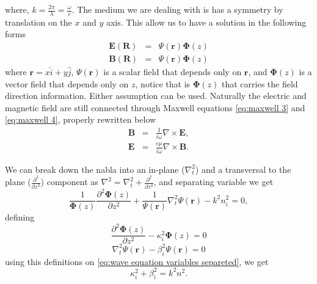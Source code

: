 \documentclass[12pt,twoside,english]{book}
\renewcommand{\~}{\perispomeni}%
\numberwithin{equation}{section}
\numberwithin{figure}{section}
\begin{document}
where, $k=\frac{2\pi}{\lambda}=\frac{\omega}{c}$. The medium we are dealing with is has a symmetry by translation on the $x$ and $y$ axis. This allow us to have a solution in the following forms
\begin{eqnarray}
\mathbf{E}\left(\mathbf{R}\right) & = & \Psi\left(\mathbf{r}\right)\mathbf{\Phi}\left(z\right)\label{eq:assumption E}\\
\mathbf{B}\left(\mathbf{R}\right) & = & \Psi\left(\mathbf{r}\right)\mathbf{\Phi}\left(z\right)\label{eq:assumption B}\end{eqnarray}
where $\mathbf{r}=x\hat{i}+y\hat{j}$, $\Psi\left(\mathbf{r}\right)$ is a scalar field that depends only on $\mathbf{r}$, and $\mathbf{\Phi}\left(z\right)$ is a vector field that depends only on $z$, notice that is $\mathbf{\Phi}\left(z\right)$ that carries the field direction information. Either assumption can be used. Naturally the electric and magnetic field are still connected through Maxwell equations \ref{eq:maxwell 3} and \ref{eq:maxwell 4}, properly rewritten below
\begin{subequations}\begin{eqnarray}
\mathbf{B} & = & \frac{1}{i\omega}\nabla\times\mathbf{E},\\
\mathbf{E} & = & \frac{\epsilon\mu}{i\omega}\nabla\times\mathbf{B}.
\end{eqnarray}\end{subequations}

We can break down the nabla into an in-plane ($\nabla_{t}^{2}$) and a transversal to the plane ($\frac{\partial^{2}}{\partial z^{2}}$) component as $\nabla^{2}=\nabla_{t}^{2}+\frac{\partial^{2}}{\partial z^{2}}$, and separating variable we get
\begin{equation}
\frac{1}{\mathbf{\Phi}\left(z\right)}\frac{\partial^{2}\mathbf{\Phi}\left(z\right)}{\partial z^{2}}+\frac{1}{\Psi\left(\mathbf{r}\right)}\nabla_{t}^{2}\Psi\left(\mathbf{r}\right)-k^{2}n_i^{2}=0,
\label{eq:wave equation variables separeted}\end{equation}
defining
\begin{equation}
\frac{\partial^{2}\mathbf{\Phi}\left(z\right)}{\partial z^{2}}-\kappa_i^{2}\mathbf{\Phi}\left(z\right)=0\label{eq:out plane wave equation}\end{equation}
\begin{equation}
\nabla_{t}^{2}\Psi\left(\mathbf{r}\right)-\beta_i^{2}\Psi\left(\mathbf{r}\right)=0\label{eq:in plane wave equation}\end{equation}
using this definitions on \ref{eq:wave equation variables separeted}, we get
\begin{equation}
\kappa_i^{2}+\beta_i^{2}=k^{2}n^{2}.
\label{eq:kappa beta wavenumber relation}
\end{equation}
\end{document}
